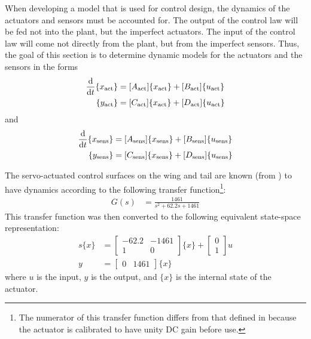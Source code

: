 When developing a model that is used for control design, the dynamics of the actuators and sensors must be accounted for. The output of the control law will be fed not into the plant, but the imperfect actuators. The input of the control law will come not directly from the plant, but from the imperfect sensors. Thus, the goal of this section is to determine dynamic models for the actuators and the sensors in the forms
\begin{equation}
\begin{aligned}
	\frac{\mathrm{d} }{\mathrm{d} t} \{x_\text{act}\} &= [A_\text{act}]\{x_\text{act}\}+[B_\text{act}]\{u_\text{act}\} \\
	\{y_\text{act}\} &= [C_\text{act}]\{x_\text{act}\}+[D_\text{act}]\{u_\text{act}\}
\end{aligned}
\end{equation}
and
\begin{equation}
\begin{aligned}
	\frac{\mathrm{d} }{\mathrm{d} t} \{x_\text{sens}\} &= [A_\text{sens}]\{x_\text{sens}\}+[B_\text{sens}]\{u_\text{sens}\} \\
	\{y_\text{sens}\} &= [C_\text{sens}]\{x_\text{sens}\}+[D_\text{sens}]\{u_\text{sens}\}
\end{aligned}
\end{equation}

The servo-actuated control surfaces on the wing and tail are known (from \cite{Quenzer2019}) to have dynamics according to the following transfer function\footnote{The numerator of this transfer function differs from that defined in \cite{Quenzer2019} because the actuator is calibrated to have unity DC gain before use.}:
\begin{align}
    G(s) &= \frac{1461}{s^2 + 62.2s + 1461}
\end{align}
This transfer function was then converted to the following equivalent state-space representation:
\begin{equation}
\begin{aligned}
    \label{eq:servoModel}
    s\{x\} &= \begin{bmatrix} -62.2 & -1461 \\ 1 & 0 \end{bmatrix} \{x\}
        + \begin{bmatrix} 0 \\ 1 \end{bmatrix} u \\
    y &= \begin{bmatrix} 0 & 1461 \end{bmatrix} \{x\}
\end{aligned}
\end{equation}
where $u$ is the input, $y$ is the output, and $\{x\}$ is the internal state of the actuator.

